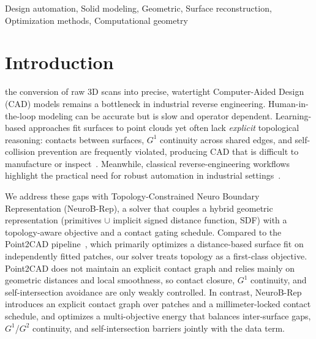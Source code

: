 \documentclass{ieeeaccess}
\begin{document}
\begin{keywords}
Design automation, Solid modeling, Geometric, Surface reconstruction, Optimization methods, Computational geometry
\end{keywords}


\titlepgskip=-15pt
\maketitle

\section{Introduction}
\label{sec:introduction}
 the conversion of raw 3D scans into precise, watertight Computer-Aided Design (CAD) models remains a bottleneck in industrial reverse engineering. Human-in-the-loop modeling can be accurate but is slow and operator dependent. Learning-based approaches fit surfaces to point clouds yet often lack \emph{explicit} topological reasoning: contacts between surfaces, $G^1$ continuity across shared edges, and self-collision prevention are frequently violated, producing CAD that is difficult to manufacture or inspect~\cite{b2,b3,b4,b20,b1,b9,b24}. Meanwhile, classical reverse-engineering workflows highlight the practical need for robust automation in industrial settings~\cite{b16,b25}.

We address these gaps with Topology-Constrained Neuro Boundary Representation (NeuroB-Rep), a solver that couples a hybrid geometric representation (primitives $\cup$ implicit signed distance function, SDF) with a topology-aware objective and a contact gating schedule. 
Compared to the Point2CAD pipeline~\cite{b2}, which primarily optimizes a distance-based surface fit on independently fitted patches, our solver treats topology as a first-class objective. Point2CAD does not maintain an explicit contact graph and relies mainly on geometric distances and local smoothness, so contact closure, $G^1$ continuity, and self-intersection avoidance are only weakly controlled. In contrast, NeuroB-Rep introduces an explicit contact graph over patches and a millimeter-locked contact schedule, and optimizes a multi-objective energy that balances inter-surface gaps, $G^1$/$G^2$ continuity, and self-intersection barriers jointly with the data term.
\end{document}
